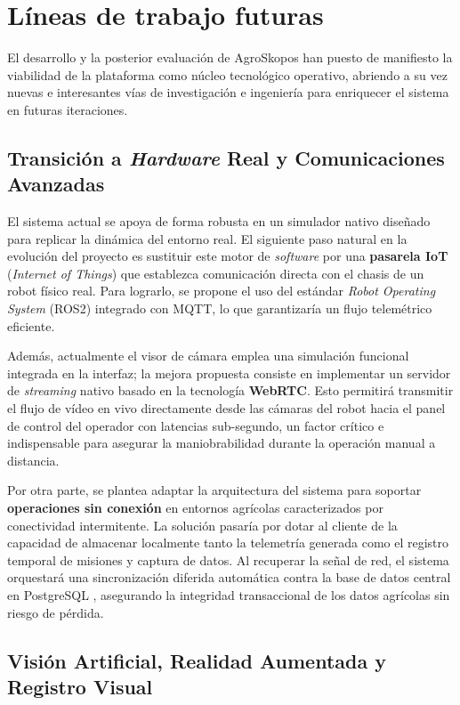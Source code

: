 \section{Líneas de trabajo futuras}

El desarrollo y la posterior evaluación de AgroSkopos han puesto de manifiesto la viabilidad de la plataforma como núcleo tecnológico operativo, abriendo a su vez nuevas e interesantes vías de investigación e ingeniería para enriquecer el sistema en futuras iteraciones.

\subsection{Transición a \textit{Hardware} Real y Comunicaciones Avanzadas}

El sistema actual se apoya de forma robusta en un simulador nativo diseñado para replicar la dinámica del entorno real. El siguiente paso natural en la evolución del proyecto es sustituir este motor de \textit{software} por una \textbf{pasarela IoT} (\textit{Internet of Things}) que establezca comunicación directa con el chasis de un robot físico real. Para lograrlo, se propone el uso del estándar \textit{Robot Operating System} (ROS2) integrado con MQTT, lo que garantizaría un flujo telemétrico eficiente. 

Además, actualmente el visor de cámara emplea una simulación funcional integrada en la interfaz; la mejora propuesta consiste en implementar un servidor de \textit{streaming} nativo basado en la tecnología \textbf{WebRTC}. Esto permitirá transmitir el flujo de vídeo en vivo directamente desde las cámaras del robot hacia el panel de control del operador con latencias sub-segundo, un factor crítico e indispensable para asegurar la maniobrabilidad durante la operación manual a distancia.

Por otra parte, se plantea adaptar la arquitectura del sistema para soportar \textbf{operaciones sin conexión} en entornos agrícolas caracterizados por conectividad intermitente. La solución pasaría por dotar al cliente de la capacidad de almacenar localmente tanto la telemetría generada como el registro temporal de misiones y captura de datos. Al recuperar la señal de red, el sistema orquestará una sincronización diferida automática contra la base de datos central en PostgreSQL \cite{postgresql}, asegurando la integridad transaccional de los datos agrícolas sin riesgo de pérdida.

\subsection{Visión Artificial, Realidad Aumentada y Registro Visual}

